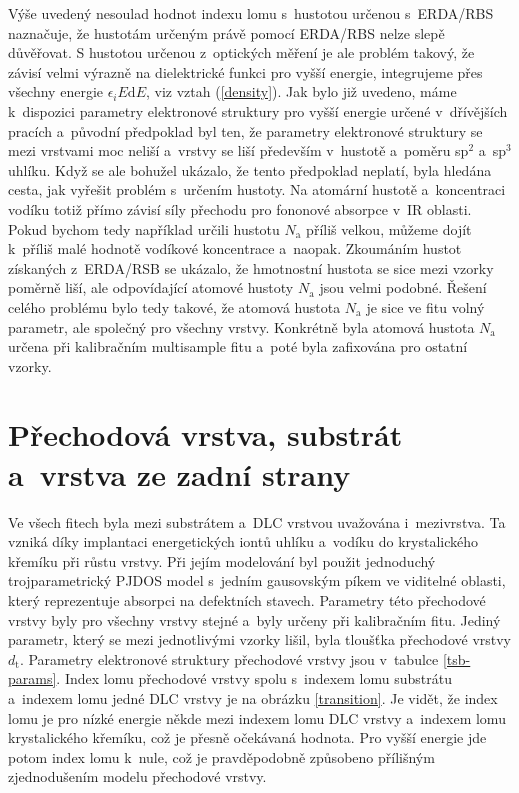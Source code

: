Výše uvedený nesoulad hodnot indexu lomu s~hustotou určenou s~ERDA/RBS naznačuje, že hustotám určeným právě pomocí ERDA/RBS nelze slepě důvěřovat. S hustotou určenou z~optických měření je ale problém takový, že závisí velmi výrazně na dielektrické funkci pro vyšší energie, integrujeme přes všechny energie $\epsilon_i E \mathrm{d}E$, viz vztah (\ref{density}). 
Jak bylo již uvedeno, máme k~dispozici parametry elektronové struktury pro vyšší energie určené v~dřívějších pracích a~původní předpoklad byl ten, že parametry elektronové struktury se mezi vrstvami moc neliší a~vrstvy se liší především v~hustotě a~poměru sp$^2$ a~sp$^3$ uhlíku. Když se ale bohužel ukázalo, že tento předpoklad neplatí, byla hledána cesta, jak vyřešit problém s~určením hustoty. Na atomární hustotě a~koncentraci vodíku totiž přímo závisí síly přechodu pro fononové absorpce v~IR oblasti. 
Pokud bychom tedy například určili hustotu $N_\mathrm{a}$ příliš velkou, můžeme dojít k~příliš malé hodnotě vodíkové koncentrace a~naopak. Zkoumáním hustot získaných z~ERDA/RSB se ukázalo, že hmotnostní hustota se sice mezi vzorky poměrně liší, ale odpovídající atomové hustoty $N_\mathrm{a}$ jsou velmi podobné. 
Řešení celého problému bylo tedy takové, že atomová hustota $N_\mathrm{a}$ je sice ve fitu volný parametr, ale společný pro všechny vrstvy. Konkrétně byla atomová hustota $N_\mathrm{a}$ určena při kalibračním multisample fitu a~poté byla zafixována pro ostatní vzorky.

\section{Přechodová vrstva, substrát a~vrstva ze zadní strany}
Ve všech fitech byla mezi substrátem a~DLC vrstvou uvažována i~mezivrstva. Ta vzniká díky implantaci energetických iontů uhlíku a~vodíku do krystalického křemíku při růstu vrstvy. 
Při jejím modelování byl použit jednoduchý trojparametrický PJDOS model s~jedním gausovským píkem ve viditelné oblasti, který reprezentuje absorpci na defektních stavech. 
Parametry této přechodové vrstvy byly pro všechny vrstvy stejné a~byly určeny při kalibračním fitu. Jediný parametr, který se mezi jednotlivými vzorky lišil, byla tloušťka přechodové vrstvy $d_\mathrm{t}$. 
Parametry elektronové struktury přechodové vrstvy jsou v~tabulce \ref{tsb-params}. Index lomu přechodové vrstvy spolu s~indexem lomu substrátu a~indexem lomu jedné DLC vrstvy je na obrázku \ref{transition}. 
Je vidět, že index lomu je pro nízké energie někde mezi indexem lomu DLC vrstvy a~indexem lomu krystalického křemíku, což je přesně očekávaná hodnota. Pro vyšší energie jde potom index lomu k~nule, což je pravděpodobně způsobeno přílišným zjednodušením modelu přechodové vrstvy.

